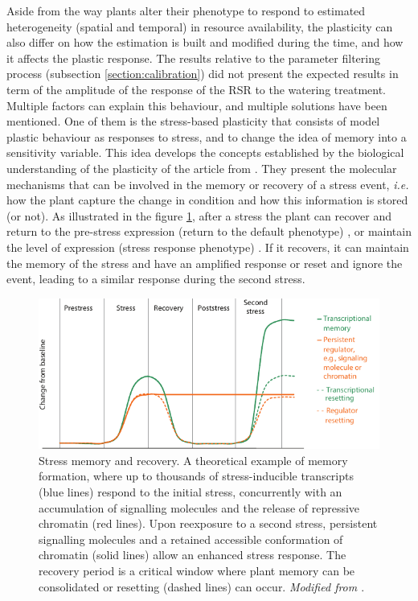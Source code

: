 Aside from the way plants alter their phenotype to respond to estimated heterogeneity (spatial and temporal) in resource availability, the plasticity can also differ on how the estimation is built and modified during the time, and how it affects the plastic response. The results relative to the parameter filtering process (subsection \ref{section:calibration}) did not present the expected results in term of the amplitude of the response of the RSR to the watering treatment. Multiple factors can explain this behaviour, and multiple solutions have been mentioned. One of them is the stress-based plasticity that consists of model plastic behaviour as responses to stress, and to change the idea of memory into a sensitivity variable. This idea develops the concepts established by the biological understanding of the plasticity of the article from \citet{crisp_reconsidering_2016}. They present the molecular mechanisms that can be involved in the memory or recovery of a stress event, \textit{i.e.} how the plant capture the change in condition and how this information is stored (or not). As illustrated in the figure \ref{fig:stress_memory}, after a stress the plant can recover and return to the pre-stress expression (return to the default phenotype) \parencite{liu_biomass_2004}, or maintain the level of expression (stress response phenotype) \parencite{peterson_growth_1982}. If it recovers, it can maintain the memory of the stress and have an amplified response or reset and ignore the event, leading to a similar response during the second stress.



\begin{figure}\label{fig:stress_memory}
\includegraphics[width = \textwidth]{./2_PP/Figures/Concepts/stress_memory.pdf}
\caption[Stress memory and recovery]{Stress memory and recovery. A theoretical example of memory formation, where up to thousands of stress-inducible transcripts (blue lines) respond to the initial stress, concurrently with an accumulation of signalling molecules and the release of repressive chromatin (red lines). Upon reexposure to a second stress, persistent signalling molecules and a retained accessible conformation of chromatin (solid lines) allow an enhanced stress response. The recovery period is a critical window where plant memory can be consolidated or resetting (dashed lines) can occur. \textit{Modified from \citet{crisp_reconsidering_2016}}.}
\end{figure}


